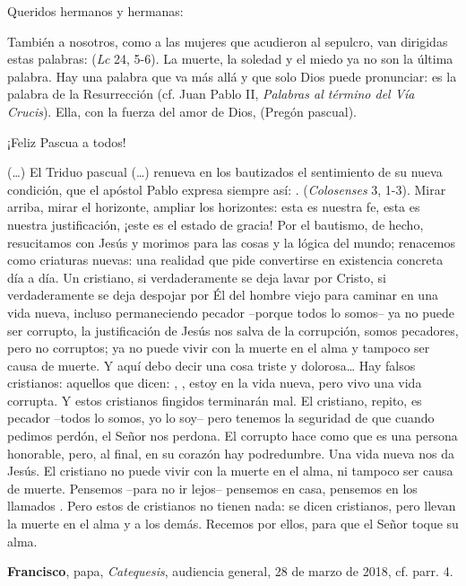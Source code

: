 \begin{body}
Queridos hermanos y hermanas:

También a nosotros, como a las mujeres que acudieron al sepulcro, van dirigidas estas palabras:  (\textit{Lc} 24, 5-6). La muerte, la soledad y el miedo ya no son la última palabra. Hay una palabra que va más allá y que solo Dios puede pronunciar: es la palabra de la Resurrección (cf. Juan Pablo II, \textit{Palabras al término del Vía Crucis}). Ella, con la fuerza del amor de Dios,  (Pregón pascual).

¡Feliz Pascua a todos!
\end{body}


\begin{patercite}
(\ldots) El Triduo pascual (\ldots) renueva en los bautizados el sentimiento de su nueva condición, que el apóstol Pablo expresa siempre así: . (\textit{Colosenses} 3, 1-3). Mirar arriba, mirar el horizonte, ampliar los horizontes: esta es nuestra fe, esta es nuestra justificación, ¡este es el estado de gracia! Por el bautismo, de hecho, resucitamos con Jesús y morimos para las cosas y la lógica del mundo; renacemos como criaturas nuevas: una realidad que pide convertirse en existencia concreta día a día. Un cristiano, si verdaderamente se deja lavar por Cristo, si verdaderamente se deja despojar por Él del hombre viejo para caminar en una vida nueva, incluso permaneciendo pecador --porque todos lo somos-- ya no puede ser corrupto, la justificación de Jesús nos salva de la corrupción, somos pecadores, pero no corruptos; ya no puede vivir con la muerte en el alma y tampoco ser causa de muerte. Y aquí debo decir una cosa triste y dolorosa\ldots{} Hay falsos cristianos: aquellos que dicen: , , estoy en la vida nueva, pero vivo una vida corrupta. Y estos cristianos fingidos terminarán mal. El cristiano, repito, es pecador --todos lo somos, yo lo soy-- pero tenemos la seguridad de que cuando pedimos perdón, el Señor nos perdona. El corrupto hace como que es una persona honorable, pero, al final, en su corazón hay podredumbre. Una vida nueva nos da Jesús. El cristiano no puede vivir con la muerte en el alma, ni tampoco ser causa de muerte. Pensemos --para no ir lejos-- pensemos en casa, pensemos en los llamados . Pero estos de cristianos no tienen nada: se dicen cristianos, pero llevan la muerte en el alma y a los demás. Recemos por ellos, para que el Señor toque su alma.
		
\textbf{Francisco}, papa, \textit{Catequesis}, audiencia general,  28 de marzo de 2018, cf. parr. 4.
	\end{patercite}

